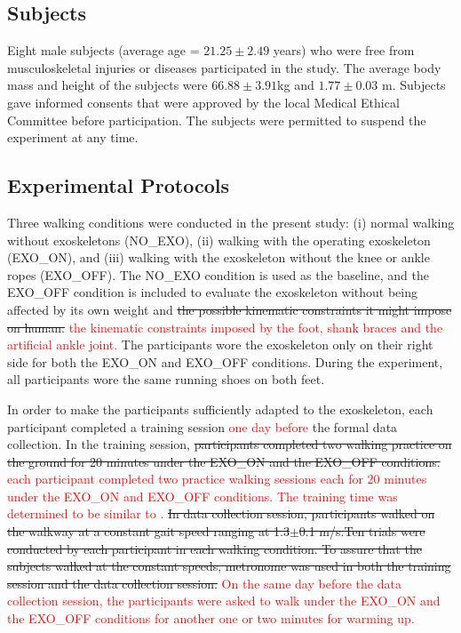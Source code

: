 \documentclass[twocolumn,cleanfoot,10pt]{asme2ej}
\begin{document}
\subsection{Subjects}
Eight male subjects (average age = $21.25 \pm2.49$ years) who were free from musculoskeletal injuries or diseases participated in the study.
The average body mass and height of the subjects were $66.88\pm3.91$kg and $1.77\pm0.03$ m.
Subjects gave informed consents that were approved by the local Medical Ethical Committee before participation.
The subjects were permitted to suspend the experiment at any time.   

\subsection{Experimental Protocols}
Three walking conditions were conducted in the present study: (i) normal walking without exoskeletons (NO\_EXO), (ii) walking with the operating exoskeleton (EXO\_ON), and (iii) walking with the exoskeleton without the knee or ankle ropes (EXO\_OFF).
The NO\_EXO condition is used as the baseline, and the EXO\_OFF condition is included to evaluate the exoskeleton without being affected by its own weight and \sout{the possible kinematic constraints it might impose on human.} \textcolor{red}{the kinematic constraints imposed by the foot, shank braces and the artificial ankle joint.}
The participants wore the exoskeleton only on their right side for both the EXO\_ON and EXO\_OFF conditions.
During the experiment, all participants wore the same running shoes on both feet. 

In order to make the participants sufficiently adapted to the exoskeleton, each participant completed a training session \textcolor{red}{one day before} the formal data collection.
In the training session, \sout{participants completed two walking practice on the ground for 20 minutes under the EXO\_ON and the EXO\_OFF conditions.} \textcolor{red}{each participant completed two practice walking sessions each for 20 minutes under the EXO\_ON and EXO\_OFF conditions.
The training time was determined to be similar to \cite{RN5}.}
\sout{In data collection session, participants walked on the walkway at a constant gait speed ranging at 1.3$\pm$0.1 m/s.Ten trials were conducted by each participant in each walking condition. To assure that the subjects walked at the constant speeds, metronome was used in both the training session and the data collection session.}
\textcolor{red}{On the same day before the data collection session, the participants were asked to walk under the EXO\_ON and the EXO\_OFF conditions for another one or two minutes for warming up.}
\end{document}
